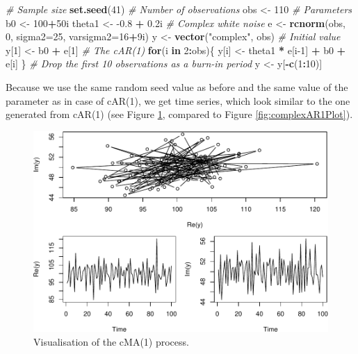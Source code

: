 \documentclass[
]{book}
\newenvironment{Shaded}{\begin{snugshade}}{\end{snugshade}}
\newcommand{\CommentTok}[1]{\textcolor[rgb]{0.56,0.35,0.01}{\textit{#1}}}
\newcommand{\ControlFlowTok}[1]{\textcolor[rgb]{0.13,0.29,0.53}{\textbf{#1}}}
\newcommand{\DataTypeTok}[1]{\textcolor[rgb]{0.13,0.29,0.53}{#1}}
\newcommand{\DecValTok}[1]{\textcolor[rgb]{0.00,0.00,0.81}{#1}}
\newcommand{\FloatTok}[1]{\textcolor[rgb]{0.00,0.00,0.81}{#1}}
\newcommand{\KeywordTok}[1]{\textcolor[rgb]{0.13,0.29,0.53}{\textbf{#1}}}
\newcommand{\NormalTok}[1]{#1}
\newcommand{\OperatorTok}[1]{\textcolor[rgb]{0.81,0.36,0.00}{\textbf{#1}}}
\newcommand{\StringTok}[1]{\textcolor[rgb]{0.31,0.60,0.02}{#1}}
\begin{document}
\begin{Shaded}
\begin{Highlighting}[]
\CommentTok{\# Sample size}
\KeywordTok{set.seed}\NormalTok{(}\DecValTok{41}\NormalTok{)}
\CommentTok{\# Number of observations}
\NormalTok{obs \textless{}{-}}\StringTok{ }\DecValTok{110}
\CommentTok{\# Parameters}
\NormalTok{b0 \textless{}{-}}\StringTok{ }\DecValTok{100}\OperatorTok{+}\NormalTok{50i}
\NormalTok{theta1 \textless{}{-}}\StringTok{ }\FloatTok{{-}0.8} \OperatorTok{+}\StringTok{ }\FloatTok{0.2}\NormalTok{i}
\CommentTok{\# Complex white noise}
\NormalTok{e \textless{}{-}}\StringTok{ }\KeywordTok{rcnorm}\NormalTok{(obs, }\DecValTok{0}\NormalTok{, }\DataTypeTok{sigma2=}\DecValTok{25}\NormalTok{, }\DataTypeTok{varsigma2=}\DecValTok{16}\OperatorTok{+}\NormalTok{9i)}
\NormalTok{y \textless{}{-}}\StringTok{ }\KeywordTok{vector}\NormalTok{(}\StringTok{"complex"}\NormalTok{, obs)}
\CommentTok{\# Initial value}
\NormalTok{y[}\DecValTok{1}\NormalTok{] \textless{}{-}}\StringTok{ }\NormalTok{b0 }\OperatorTok{+}\StringTok{ }\NormalTok{e[}\DecValTok{1}\NormalTok{]}
\CommentTok{\# The cAR(1)}
\ControlFlowTok{for}\NormalTok{(i }\ControlFlowTok{in} \DecValTok{2}\OperatorTok{:}\NormalTok{obs)\{}
\NormalTok{    y[i] \textless{}{-}}\StringTok{ }\NormalTok{theta1 }\OperatorTok{*}\StringTok{ }\NormalTok{e[i}\DecValTok{{-}1}\NormalTok{] }\OperatorTok{+}\StringTok{ }\NormalTok{b0 }\OperatorTok{+}\StringTok{ }\NormalTok{e[i]}
\NormalTok{\}}
\CommentTok{\# Drop the first 10 observations as a burn{-}in period}
\NormalTok{y \textless{}{-}}\StringTok{ }\NormalTok{y[}\OperatorTok{{-}}\KeywordTok{c}\NormalTok{(}\DecValTok{1}\OperatorTok{:}\DecValTok{10}\NormalTok{)]}
\end{Highlighting}
\end{Shaded}

Because we use the same random seed value as before and the same value of the parameter as in case of cAR(1), we get time series, which look similar to the one generated from cAR(1) (see Figure \ref{fig:complexMA1Plot}, compared to Figure \ref{fig:complexAR1Plot}).

\begin{figure}
\centering
\includegraphics{Svetunkov---Svetunkov---Complex-Valued-Econometrics_files/figure-latex/complexMA1Plot-1.pdf}
\caption{\label{fig:complexMA1Plot}Visualisation of the cMA(1) process.}
\end{figure}
\end{document}
